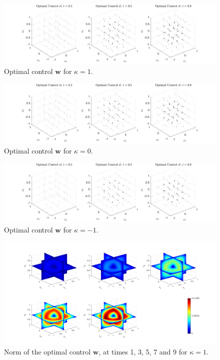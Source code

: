 \documentclass[11pt, a4paper]{article}
\theoremstyle{definition}
\newcommand{\w}{\mathbf{w}}
\begin{document}
	\begin{figure}[h]
		\centering
		\includegraphics[scale=0.35]{Controlk1.png}
		\caption{Optimal control $\w$ for $\kappa = 1$.} 
		\label{F5}
	\end{figure}
	\begin{figure}[h]
		\centering
		\includegraphics[scale=0.35]{Controlk0.png}
		\caption{Optimal control $\w$ for $\kappa = 0$.} 
		\label{F6}
	\end{figure}
	\begin{figure}[h]
		\centering
		\includegraphics[scale=0.35]{Controlkn1.png}
		\caption{Optimal control $\w$ for $\kappa = -1$.} 
		\label{F7}
	\end{figure}
	
	\begin{figure}[h]
		\centering
		\includegraphics[scale=0.35]{wNormk1.png}
		\caption{Norm of the optimal control $\w$, at times 1, 3, 5, 7 and 9 for $\kappa = 1$.} 
		\label{F4a}
	\end{figure}
	
\end{document}
